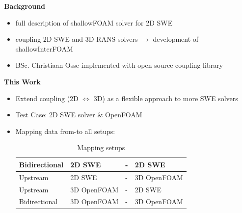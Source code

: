 \begin{frame}
\begin{multicols}{2}
\end{multicols}
\end{frame}
\clearpage


\begin{frame}
\begin{multicols}{2}
    
 \hspace{0.35\columnwidth}\textbf{Background}

 \begin{itemize}
  \item  full description of shallowFOAM  solver for 2D SWE \cite{mintgen}
 \item  coupling 2D SWE and 3D RANS solvers $\rightarrow$ development of shallowInterFOAM \cite{mintgen}
 \item BSc. Christiaan Osse implemented \cite{mintgen} with open source coupling library
 \end{itemize}
    
 \vfill\columnbreak

\hspace{0.35\columnwidth}\textbf{This Work}
 \begin{itemize}
 \item Extend \cite{mintgen} coupling (2D $\Longleftrightarrow$ 3D) as a flexible approach to more SWE solvers
 \item Test Case: 2D SWE solver \& OpenFOAM 
 \item Mapping data from-to all setups: \vspace{0.4cm}
\begin{table}[]
\begin{tabular}{|llll|}
\hline
Bidirectional & 2D SWE       & - & 2D SWE       \\ \hline
Upstream      & 2D SWE       & - & 3D OpenFOAM \\ \hline
Upstream      & 3D OpenFOAM & - & 2D SWE       \\ \hline
Bidirectional & 3D OpenFOAM & - & 3D OpenFOAM \\ \hline
\end{tabular}
\caption{Mapping setups}
\label{table:1}
\end{table}
\end{itemize}
\end{multicols}
\end{frame}



